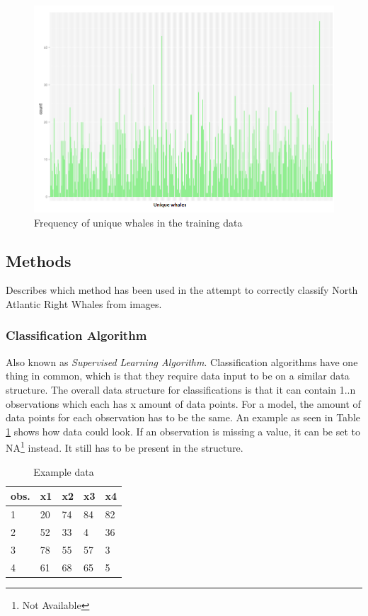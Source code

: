 \begin{figure}
	\centering
	\includegraphics[width=\linewidth]{Images/FrequencyPlot}
	\caption{Frequency of unique whales in the training data}
	\label{fig:whale-frequency}
\end{figure}

\subsection{Methods}
Describes which method has been used in the attempt to correctly classify North Atlantic Right Whales from images.

\subsubsection{Classification Algorithm}
Also known as \emph{Supervised Learning Algorithm}. Classification algorithms have one thing in common, which is that they require data input to be on a similar data structure.
The overall data structure for classifications is that it can contain 1..n observations which each has x amount of data points. For a model, the amount of data points for each observation has to be the same. An example as seen in Table \ref{tab:example data} shows how data could look.
If an observation is missing a value, it can be set to NA\footnote{Not Available} instead. It still has to be present in the structure.

\begin{table}
  \centering
  \caption{Example data}
  \label{tab:example data}
  \begin{tabularx}{\linewidth}{|l|X|X|X|X|} \hline
    obs. & x1 & x2 & x3 & x4 \\ \hline
    1    & 20 & 74 & 84 & 82 \\ \hline
    2    & 52 & 33 & 4  & 36 \\ \hline
    3    & 78 & 55 & 57 & 3  \\ \hline
    4    & 61 & 68 & 65 & 5  \\ \hline
  \end{tabularx}
\end{table}

